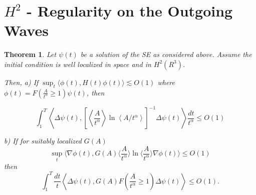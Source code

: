 \documentclass[11pt]{article}
\newtheorem{theorem}{Theorem}[section]
\begin{document}
\section{$H^{2}$ - Regularity on the Outgoing Waves}

\begin{theorem}

Let $\psi(t)$ be a solution of the SE as considered above.
Assume the initial condition is well localized in space and in $H^{2}\left(R^{3}\right)$.


Then,\newline
a) If $\sup _{t}\langle\phi(t), H(t) \phi(t)\rangle \lesssim O(1)$
where $\phi(t)=F\left(\frac{A}{t^{\alpha}} \geqslant 1\right) \psi(t)$,
then

\begin{equation}
\int_{1}^{T}\left\langle\Delta \psi(t),\left[\left\langle\frac{A}{t^{\alpha}}\right\rangle \ln \left\langle A / t^{\alpha}\right\rangle\right]^{-1} \Delta \psi(t)\right\rangle \frac{d t}{t^{\alpha}} \leq O(1) \tag{C.2}
\end{equation}

b) If for suitably localized $G(A)$ \begin{equation}
\sup_t \langle \nabla\phi(t),G(A)\langle\frac{A}{t^{\alpha}}\rangle\ln{\langle\frac{A}{t^{\alpha}}\rangle}  \nabla \phi(t)\rangle\leq O(1) \tag{C.3a}\end{equation}
then \begin{equation}
\int_{1}^{T} \frac{d t}{t}\left\langle\Delta \psi(t), G(A) F\left(\frac{A}{t^{\alpha}} \geqslant 1\right) \Delta \psi(t)\right\rangle \leq O(1). \tag{C.3b}\end{equation}  
\end{theorem}
\end{document}
